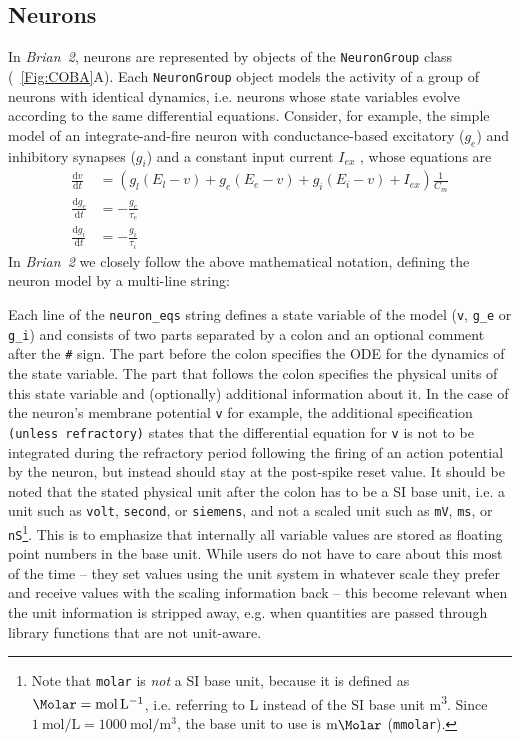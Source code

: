 \documentclass[a4paper, 11pt]{article}
\newcommand{\brian}{\emph{Brian~2}\xspace}
\newcommand{\der}[2]{\frac{\mathrm{d}#1}{\mathrm{d}#2}}
\newcommand*{\figref}[1]{\figurename~\ref{#1}}
\begin{document}
\subsection{Neurons}\label{sec:neurons}
In \brian, neurons are represented by objects of the \lstinline|NeuronGroup| class (\figref{Fig:COBA}A). Each \lstinline|NeuronGroup| object models the activity of a group of neurons with identical dynamics, i.e. neurons whose state variables evolve according to the same differential equations. Consider, for example, the simple model of an integrate-and-fire neuron with conductance-based excitatory ($g_e$) and inhibitory synapses ($g_i$) and a constant input current $I_{ex}$ \citep{Dayan2001}, whose equations are
\begin{align}
\der{v}{t} &= \left(g_l \left(E_l - v\right) + g_e \left(E_e - v\right) + g_i \left(E_i -v \right) + I_{ex} \right) \frac{1}{C_m} \label{eq:neuron-v}\\
\der{g_e}{t} &= -\frac{g_e}{\tau_e}\\
\der{g_i}{t} &= -\frac{g_i}{\tau_i} \label{eq:neuron-gi}
\end{align}
In \brian we closely follow the above mathematical notation, defining the neuron model by a multi-line string:

Each line of the \lstinline|neuron_eqs| string defines a state variable of the model (\lstinline|v|, \lstinline|g_e| or \lstinline|g_i|) and consists of two parts separated by a colon and an optional comment after the \verb|#| sign.
The part before the colon specifies the ODE for the dynamics of the state variable.
The part that follows the colon specifies the physical units of this state variable and (optionally) additional information about it.
In the case of the neuron's membrane potential \lstinline|v| for example, the additional specification \lstinline|(unless refractory)| states that the differential equation for \lstinline|v| is not to be integrated during the refractory period following the firing of an action potential by the neuron, but instead should stay at the post-spike reset value.
It should be noted that the stated physical unit after the colon has to be a SI base unit, i.e. a unit such as \lstinline|volt|, \lstinline|second|, or \lstinline|siemens|, and not a scaled unit such as \lstinline|mV|, \lstinline|ms|, or \lstinline|nS|\footnote{Note that \lstinline|molar| is \emph{not} a SI base unit, because it is defined as $\si{\Molar} = \si{\mole\per\liter}$, i.e. referring to \si{\liter} instead of the SI base unit \si{\cubic\meter}. Since $\SI{1}{\mole\per\liter} = \SI{1000}{\mole\per\cubic\meter}$, the base unit to use is $\si{\milli\Molar}$ (\lstinline|mmolar|).}.
This is to emphasize that internally all variable values are stored as floating point numbers in the base unit.
While users do not have to care about this most of the time -- they set values using the unit system in whatever scale they prefer and receive values with the scaling information back -- this become relevant when the unit information is stripped away, e.g. when quantities are passed through library functions that are not unit-aware.
\end{document}

